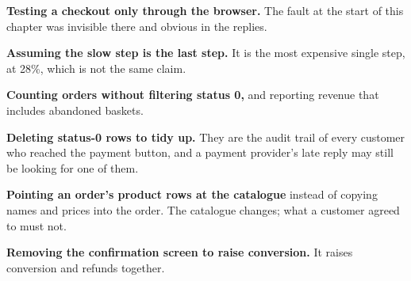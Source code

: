 \begin{pitfall}
\begin{tight}
  \item \textbf{Testing a checkout only through the browser.} The fault at the
        start of this chapter was invisible there and obvious in the replies.
  \item \textbf{Assuming the slow step is the last step.} It is the most
        expensive single step, at 28\%, which is not the same claim.
  \item \textbf{Counting orders without filtering status 0,} and reporting
        revenue that includes abandoned baskets.
  \item \textbf{Deleting status-0 rows to tidy up.} They are the audit trail of
        every customer who reached the payment button, and a payment provider's
        late reply may still be looking for one of them.
  \item \textbf{Pointing an order's product rows at the catalogue} instead of
        copying names and prices into the order. The catalogue changes; what a
        customer agreed to must not.
  \item \textbf{Removing the confirmation screen to raise conversion.} It
        raises conversion and refunds together.
\end{tight}
\end{pitfall}

